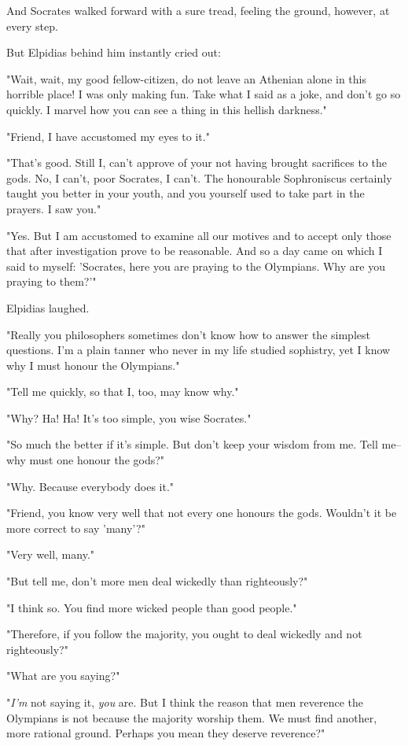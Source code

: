 And Socrates walked forward with a sure tread, feeling the ground,
however, at every step.

But Elpidias behind him instantly cried out:

"Wait, wait, my good fellow-citizen, do not leave an Athenian alone in
this horrible place! I was only making fun. Take what I said as a
joke, and don't go so quickly. I marvel how you can see a thing in
this hellish darkness."

"Friend, I have accustomed my eyes to it."

"That's good. Still I, can't approve of your not having brought
sacrifices to the gods. No, I can't, poor Socrates, I can't. The
honourable Sophroniscus certainly taught you better in your youth, and
you yourself used to take part in the prayers. I saw you."

"Yes. But I am accustomed to examine all our motives and to accept
only those that after investigation prove to be reasonable. And so a
day came on which I said to myself: 'Socrates, here you are praying to
the Olympians. Why are you praying to them?'"

Elpidias laughed.

"Really you philosophers sometimes don't know how to answer the
simplest questions. I'm a plain tanner who never in my life studied
sophistry, yet I know why I must honour the Olympians."

"Tell me quickly, so that I, too, may know why."

"Why? Ha! Ha! It's too simple, you wise Socrates."

"So much the better if it's simple. But don't keep your wisdom from
me. Tell me--why must one honour the gods?"

"Why. Because everybody does it."

"Friend, you know very well that not every one honours the gods.
Wouldn't it be more correct to say 'many'?"

"Very well, many."

"But tell me, don't more men deal wickedly than righteously?"

"I think so. You find more wicked people than good people."

"Therefore, if you follow the majority, you ought to deal wickedly and
not righteously?"

"What are you saying?"

"\emph{I'm} not saying it, \emph{you} are. But I think the reason that men
reverence the Olympians is not because the majority worship them. We
must find another, more rational ground. Perhaps you mean they deserve
reverence?"


